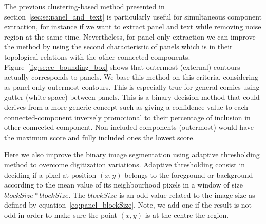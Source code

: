 The previous clustering-based method presented in section~\ref{sec:se:panel_and_text} is particularly useful for simultaneous component extraction, for instance if we want to extract panel and text while removing noise region at the same time.
Nevertheless, for panel only extraction we can improve the method by using the second characteristic of panels which is in their topological relations with the other connected-components.
Figure~\ref{fig:se:cc_bounding_box} shows that outermost (external) contours actually corresponds to panels.
We base this method on this criteria, considering as panel only outermost contours.
This is especially true for general comics using gutter (white space) between panels.
This is a binary decision method that could derives from a more generic concept such as giving a confidence value to each connected-component inversely promotional to their percentage of inclusion in other connected-component.
Non included components (outermost) would have the maximum score and fully included ones the lowest score.

Here we also improve the binary image segmentation using adaptive thresholding method to overcome digitization variations.
Adaptive thresholding consist in deciding if a pixel at position $(x,y)$ belongs to the foreground or background according to the mean value of its neighbourhood pixels in a window of size $blockSize * blockSize$.
The $blockSize$ is an odd value related to the image size as defined by equation~\ref{eq:panel_blockSize}.
Note, we add one if the result is not odd in order to make sure the point $(x,y)$ is at the centre the region.

